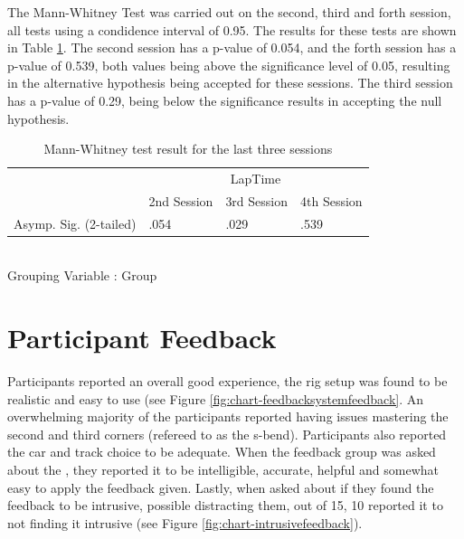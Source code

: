 The Mann-Whitney Test was carried out on the second, third and forth session, all tests using a condidence interval of 0.95. The results for these tests are shown in Table \ref{table:Mann-Whitney-Sessions}. The second session has a p-value of 0.054, and the forth session has a p-value of 0.539, both values being above the significance level of 0.05, resulting in the alternative hypothesis being accepted for these sessions. The third session has a p-value of 0.29, being below the significance results in accepting the null hypothesis.


\begin{table}[]
	\centering
	\begin{tabular}{|l|l|l|l|}
		\hline
		& \multicolumn{3}{c|}{LapTime}            \\ \cline{2-4} 
		& 2nd Session & 3rd Session & 4th Session \\ \hline
		Asymp. Sig. (2-tailed) & .054        & .029        & .539        \\ \hline
	\end{tabular}\\
	Grouping Variable : Group
	\caption[Mann-Whitney Test for last three Sessions]{Mann-Whitney test result for the last three sessions}
	\label{table:Mann-Whitney-Sessions}
\end{table}

\section{Participant Feedback}
\label{sec:eval-usersFeedback}
Participants reported an overall good experience, the rig setup was found to be realistic and easy to use (see Figure \ref{fig:chart-feedbacksystemfeedback}. An overwhelming majority of the participants reported having issues mastering the second and third corners (refereed to as the s-bend). Participants also reported the car and track choice to be adequate. When the feedback group was asked about the \methodname, they reported it to be intelligible, accurate, helpful and somewhat easy to apply the feedback given. Lastly, when asked about if they found the feedback to be intrusive, possible distracting them, out of 15, 10 reported it to not finding it intrusive (see Figure \ref{fig:chart-intrusivefeedback}).


